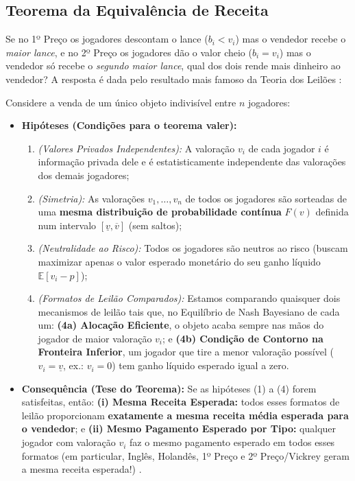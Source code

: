 \subsection{Teorema da Equivalência de Receita}
\label{subsec:equivalencia_receita}

Se no 1º Preço os jogadores descontam o lance ($b_i < v_i$) mas o vendedor recebe o \textit{maior lance}, e no 2º Preço os jogadores dão o valor cheio ($b_i = v_i$) mas o vendedor só recebe o \textit{segundo maior lance}, qual dos dois rende mais dinheiro ao vendedor? A resposta é dada pelo resultado mais famoso da Teoria dos Leilões \cite{vickrey1961,myerson1981,klemperer2004}:

\begin{teorema}
\label{teo:ret}
Considere a venda de um único objeto indivisível entre $n$ jogadores:
\begin{itemize}
    \item \textbf{Hipóteses (Condições para o teorema valer):}
    \begin{enumerate}[label=\arabic*.]
        \item \textit{(Valores Privados Independentes):} A valoração $v_i$ de cada jogador $i$ é informação privada dele e é estatisticamente independente das valorações dos demais jogadores;
        \item \textit{(Simetria):} As valorações $v_1, \dots, v_n$ de todos os jogadores são sorteadas de uma \textbf{mesma distribuição de probabilidade contínua} $F(v)$ definida num intervalo $[\underline{v}, \overline{v}]$ (sem saltos);
        \item \textit{(Neutralidade ao Risco):} Todos os jogadores são neutros ao risco (buscam maximizar apenas o valor esperado monetário do seu ganho líquido $\mathbb{E}[v_i - p]$);
        \item \textit{(Formatos de Leilão Comparados):} Estamos comparando quaisquer dois mecanismos de leilão tais que, no Equilíbrio de Nash Bayesiano de cada um: \textbf{(4a) Alocação Eficiente}, o objeto acaba sempre nas mãos do jogador de maior valoração $v_i$; e \textbf{(4b) Condição de Contorno na Fronteira Inferior}, um jogador que tire a menor valoração possível ($v_i = \underline{v}$, ex.: $v_i = 0$) tem ganho líquido esperado igual a zero.
    \end{enumerate}
    \item \textbf{Consequência (Tese do Teorema):} Se as hipóteses (1) a (4) forem satisfeitas, então: \textbf{(i) Mesma Receita Esperada:} todos esses formatos de leilão proporcionam \textbf{exatamente a mesma receita média esperada para o vendedor}; e \textbf{(ii) Mesmo Pagamento Esperado por Tipo:} qualquer jogador com valoração $v_i$ faz o mesmo pagamento esperado em todos esses formatos (em particular, Inglês, Holandês, 1º Preço e 2º Preço/Vickrey geram a mesma receita esperada!) \cite[p.~17]{klemperer2004}.
\end{itemize}
\end{teorema}

